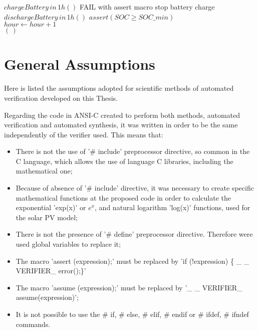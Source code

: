 \begin{algorithm}
\begin{algorithmic}[1]
\begin{scriptsize}
      \STATE $chargeBattery \, in \, 1h()$ 
      \STATE FAIL with assert macro 
      \STATE stop battery charge 
      \STATE $dischargeBattery \, in \, 1h()$ 
    \ENDIF
    \STATE $assert (SOC \geq SOC \_ min)$ \\
    \STATE $hour \leftarrow hour+1$ \\
   \ENDFOR
  \ENDFOR
 \RETURN $(\,)$ 
  \end{scriptsize}
 \end{algorithmic} 
 \label{alg:verification-algorithm}
 \end{algorithm}

%

\section{General Assumptions}
\label{sec:assumptions}

Here is listed the assumptions adopted for scientific methods of automated verification developed on this Thesis.

Regarding the code in ANSI-C created to perform both methods, automated verification and automated synthesis, it was written in order to be the same independently of the verifier used. This means that: 

\begin{itemize}
\item There is not the use of '\# include' preprocessor directive, so common in the C language, which allows the use of language C libraries, including the mathematical one;
\item Because of absence of '\# include' directive, it was necessary to create specific mathematical functions at the proposed code in order to calculate the exponential 'exp(x)' or $e^{x}$, and natural logarithm 'log(x)' functions, used for the solar PV model;
\item There is not the presence of '\# define' preprocessor directive. Therefore were used global variables to replace it;
\item The macro 'assert (expression);' must be replaced by 'if (!expression) \{ \_ \_ VERIFIER\_ error();\}'
\item The macro 'assume (expression);' must be replaced by '\_ \_ VERIFIER\_ assume(expression)';
\item It is not possible to use the \# if, \# else, \# elif, \# endif or \# ifdef, \# ifndef commands.
\end{itemize}

